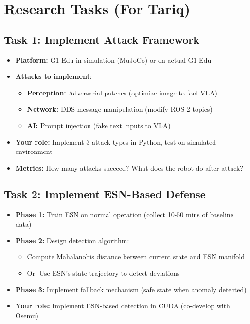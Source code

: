 \documentclass[conference]{IEEEtran}
\begin{document}
\section{Research Tasks (For Tariq)}

\subsection{Task 1: Implement Attack Framework}
\begin{itemize}
    \item \textbf{Platform:} G1 Edu in simulation (MuJoCo) or on actual G1 Edu
    \item \textbf{Attacks to implement:}
    \begin{itemize}
        \item \textbf{Perception:} Adversarial patches (optimize image to fool VLA)
        \item \textbf{Network:} DDS message manipulation (modify ROS 2 topics)
        \item \textbf{AI:} Prompt injection (fake text inputs to VLA)
    \end{itemize}
    \item \textbf{Your role:} Implement 3 attack types in Python, test on simulated environment
    \item \textbf{Metrics:} How many attacks succeed? What does the robot do after attack?
\end{itemize}

\subsection{Task 2: Implement ESN-Based Defense}
\begin{itemize}
    \item \textbf{Phase 1:} Train ESN on normal operation (collect 10-50 mins of baseline data)
    \item \textbf{Phase 2:} Design detection algorithm:
    \begin{itemize}
        \item Compute Mahalanobis distance between current state and ESN manifold
        \item Or: Use ESN's state trajectory to detect deviations
    \end{itemize}
    \item \textbf{Phase 3:} Implement fallback mechanism (safe state when anomaly detected)
    \item \textbf{Your role:} Implement ESN-based detection in CUDA (co-develop with Osemu)
\end{itemize}
\end{document}
